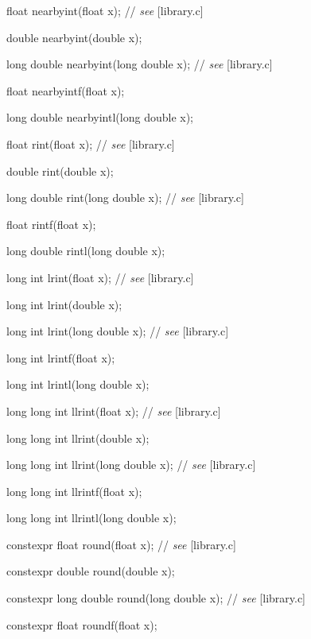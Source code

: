 \documentclass[prd,twocolumn,amsmath,amssymb,nofootinbib,eqsecnum]{revtex4-1}
\newcommand{\oldhighlight}[1]{{\color{green} #1}}
\newcommand{\stdcomment}[1]{{// {\em see} [#1]}}
\begin{document}
{%

float nearbyint(float x); \stdcomment{library.c}

double nearbyint(double x);

long double nearbyint(long double x); \stdcomment{library.c}

 float nearbyintf(float x);

 long double nearbyintl(long double x);

\vspace{2ex}


 float rint(float x); \stdcomment{library.c}

 double rint(double x);

long double rint(long double x); \stdcomment{library.c}

 float rintf(float x);

 long double rintl(long double x);

\vspace{2ex}


long int lrint(float x); \stdcomment{library.c}

 long int lrint(double x);

long int lrint(long double x); \stdcomment{library.c}

 long int lrintf(float x);

long int lrintl(long double x);

\vspace{2ex}


long long int llrint(float x); \stdcomment{library.c}

long long int llrint(double x);

long long int llrint(long double x); \stdcomment{library.c}

long long int llrintf(float x);

long long int llrintl(long double x);

\vspace{2ex}


\oldhighlight{constexpr} float round(float x); \stdcomment{library.c}

\oldhighlight{constexpr} double round(double x);

\oldhighlight{constexpr} long double round(long double x); \stdcomment{library.c}

\oldhighlight{constexpr} float roundf(float x);

}
\end{document}
